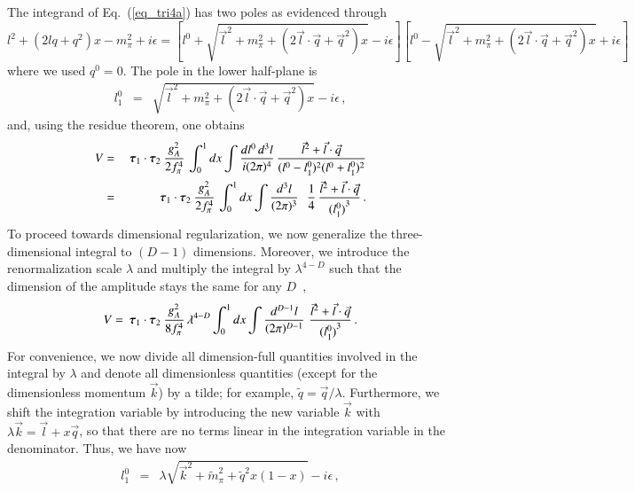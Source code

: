 \documentclass[sort&compress,preprint,3p]{elsarticle}
\newcommand{\bbox}[1]{\mbox{\boldmath $#1$}}
\begin{document}
The integrand of
Eq.~(\ref{eq_tri4a}) 
has two poles as evidenced through
%
\begin{equation}
l^2+(2lq+q^2)x-m_\pi^2 + i\epsilon =
\left[l^0 + \sqrt{\vec{l}^2+m_\pi^2+(2\vec{l}\cdot\vec{q}+\vec{q}^2)x} 
-i\epsilon\right] 
\left[l^0 - \sqrt{\vec{l}^2+m_\pi^2+(2\vec{l}\cdot\vec{q}+\vec{q}^2)x} 
+i\epsilon\right]
\end{equation}
%
where 
we used $q^0=0$. The pole in the lower half-plane is
%
\begin{eqnarray}
l^0_1 &=& \sqrt{\vec{l}^2+m_\pi^2+(2\vec{l}\cdot\vec{q}+\vec{q}^2)x} 
-i\epsilon
\,,
\end{eqnarray}
%
and, using the residue theorem, one obtains
%
\begin{eqnarray}
V &=&
\: \bbox{\tau}_1 \cdot \bbox{\tau}_2 \:
\frac{g_A^2}{2 f_\pi^4} \,
\int_0^1 dx \int \frac{dl^0\,d^{3}l}{i(2 \pi)^4}
\, \frac{\vec l^2 + \vec l \cdot \vec q}
{({l^0}-{l^0_1})^2 ({l^0}+{l^0_1})^2} 
\nonumber \\ &=& 
\: \bbox{\tau}_1 \cdot \bbox{\tau}_2 \:
\frac{g_A^2}{2 f_\pi^4} \,
\int_0^1 dx \int \frac{d^{3}l}{(2 \pi)^{3}}
\,\, 
\,\, \frac{1}{4} \, 
\frac{\vec l^2 + \vec l \cdot \vec q}{{(l_1^0)}^{3}}
\,.
\end{eqnarray}
%
To proceed towards dimensional regularization, 
we now generalize the three-dimensional integral to
$(D-1)$ dimensions.
Moreover, we introduce the renormalization scale $\lambda$
and multiply the integral by $\lambda^{4-D}$ such that the
dimension of the amplitude stays the same for any $D$~\cite{Hoo73,Col84},
\begin{equation}
V = \: \bbox{\tau}_1 \cdot \bbox{\tau}_2 \:
\frac{g_A^2}{8 f_\pi^4} \,
\lambda^{4-D} 
\int_0^1 dx \int \frac{d^{D-1}l}{(2 \pi)^{D-1}}
\,\, 
\frac{\vec l^2 + \vec l \cdot \vec q}{{(l_1^0)}^{3}}
\,.
\end{equation}
For convenience, we now divide all dimension-full quantities involved in the integral
by $\lambda$ and denote all dimensionless quantities 
(except for the dimensionless momentum $\vec k$)
by a tilde; for example, $\tilde q = \vec q / \lambda$.
Furthermore,
we shift the integration variable by introducing the new variable $\vec k$ 
with $\lambda \vec k = \vec l + x \vec q$, so that
there are no terms linear in the integration variable in the denominator. 
Thus, we have now
%
\begin{eqnarray}
l^0_1 &=& \lambda \sqrt{\vec{k}^2+\tilde m_\pi^2+\tilde q^2 x (1-x) } 
-i\epsilon
\,,
\end{eqnarray}
\end{document}
